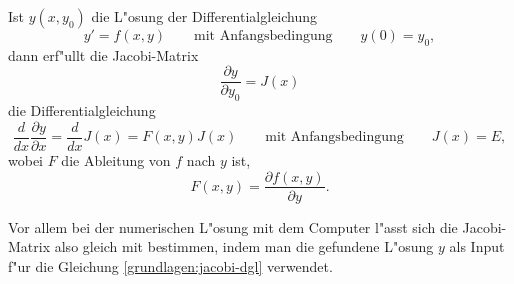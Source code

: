 \begin{satz}
Ist $y(x,y_0)$ die L"osung der Differentialgleichung 
\[
y'=f(x,y)\qquad\text{mit Anfangsbedingung}\qquad y(0)=y_0,
\]
dann erf"ullt die Jacobi-Matrix 
\[
\frac{\partial y}{\partial y_0}=J(x)
\]
die Differentialgleichung
\begin{equation}
\frac{d}{dx}\frac{\partial y}{\partial x}
=
\frac{d}{dx}J(x)
=
F(x,y)J(x)
\qquad
\text{mit Anfangsbedingung}
\qquad
J(x)=E,
\label{grundlagen:jacobi-dgl}
\end{equation}
wobei $F$ die Ableitung von $f$ nach $y$ ist,
\[
F(x,y)=\frac{\partial f(x,y)}{\partial y}.
\]
\end{satz}
Vor allem bei der numerischen L"osung mit dem Computer l"asst sich
die Jacobi-Matrix also gleich mit bestimmen, indem man die gefundene
L"osung $y$ als Input f"ur die Gleichung \eqref{grundlagen:jacobi-dgl}
verwendet.

